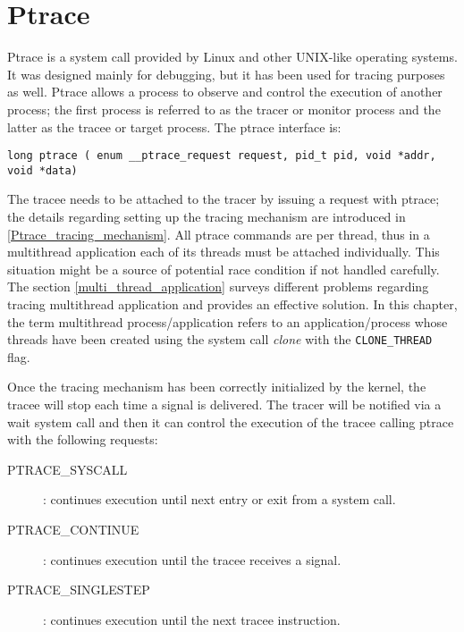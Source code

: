 \chapter{Ptrace}

Ptrace is a system call provided by Linux and other UNIX-like operating systems. It was designed mainly for debugging, but it has been used for tracing purposes as well. Ptrace allows a process to observe and control the execution of another process; the first process is referred to as the tracer or monitor process and the latter as the tracee or target process.  
The ptrace interface is:

\begin{center}
\begin{lstlisting}[caption={Synopsis ptrace system call}]
	long ptrace ( enum __ptrace_request request, pid_t pid, void *addr, void *data)
\end{lstlisting}
\end{center}


The tracee needs to be attached to the tracer by issuing a request with ptrace; the details regarding setting up the tracing mechanism are introduced in \ref{Ptrace_tracing_mechanism}. All ptrace commands are per thread, thus in a multithread application each of its threads must be attached individually. This situation might be a source of potential race condition if not handled carefully. The section  \ref{multi_thread_application} surveys different problems regarding tracing multithread application and provides an effective solution. In this chapter, the term multithread process/application refers to an application/process whose threads have been created using the system call \emph{clone} \cite{clone} with the \lstinline$CLONE_THREAD$ flag.

Once the tracing mechanism has been correctly initialized by the kernel, the tracee will stop each time a signal is delivered. The tracer will be notified via a wait system call and then it can control the execution of the tracee calling ptrace with the following requests:\\
\begin{description}
\item[PTRACE\_SYSCALL] :
	continues execution until next entry or exit from a system call.
\item[PTRACE\_CONTINUE]:
	 continues execution until the tracee receives a signal.
\item[PTRACE\_SINGLESTEP] :
	continues execution until the next tracee instruction. 
\end{description}

